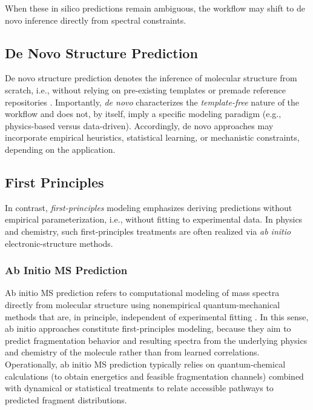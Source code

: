 When these in silico predictions remain ambiguous, the workflow may shift to de novo inference directly from spectral constraints.

\subsection{De Novo Structure Prediction}

De novo structure prediction denotes the inference of molecular structure from scratch, i.e., without relying on pre-existing templates or premade reference repositories
\cite[p.~1]{Yasonik2020}.
Importantly, \emph{de novo} characterizes the \emph{template-free} nature of the workflow and does not, by itself, imply a specific modeling paradigm (e.g., physics-based versus data-driven).
Accordingly, de novo approaches may incorporate empirical heuristics, statistical learning, or mechanistic constraints, depending on the application. \cite[pp.~701--702]{Wei2019}

\subsection{First Principles}
In contrast, \emph{first-principles} modeling emphasizes deriving predictions without empirical parameterization, i.e., without fitting to experimental data. \cite[p.~1]{Bhattacharyya2019} 
In physics and chemistry, such first-principles treatments are often realized via \emph{ab initio} electronic-structure methods.

\subsubsection{Ab Initio MS Prediction}

Ab initio MS prediction refers to computational modeling of mass spectra directly from molecular structure using nonempirical quantum-mechanical methods that are, in principle, independent of experimental fitting \cite[p.~1921]{Minkin1999}.
In this sense, ab initio approaches constitute first-principles modeling, because they aim to predict fragmentation behavior and resulting spectra from the underlying physics and chemistry of the molecule rather than from learned correlations.
Operationally, ab initio MS prediction typically relies on quantum-chemical calculations (to obtain energetics and feasible fragmentation channels) combined with dynamical or statistical treatments to relate accessible pathways to predicted fragment distributions. 

